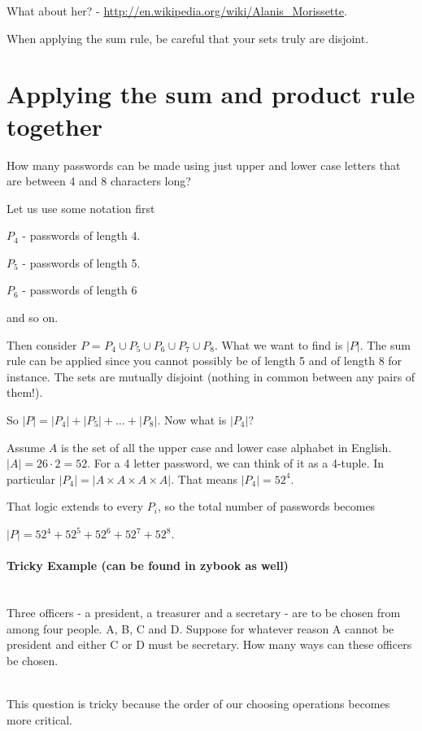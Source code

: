 \documentclass[12pt]{article}
\begin{document}
What about her? - \href{http://en.wikipedia.org/wiki/Alanis\_Morissette}{http://en.wikipedia.org/wiki/Alanis\_Morissette}.

When applying the sum rule, be careful that your sets truly are disjoint.

\section*{Applying the sum and product rule together}

How many passwords can be made using just upper and lower case letters that are between 4 and 8 characters long?

Let us use some notation first

$P_4$ - passwords of length 4.

$P_5$ - passwords of length 5.

$P_6$ - passwords of length 6

and so on.

Then consider $P$ = $P_4 \cup P_5 \cup P_6 \cup P_7 \cup P_8$. What we want to find is $|P|$. The sum rule can be applied since you cannot possibly be of length 5 and of length 8 for instance. The sets are mutually disjoint (nothing in common between any pairs of them!).

So $|P| = |P_4| + |P_5| + \ldots + |P_8|$. Now what is $|P_4|$?

Assume $A$ is the set of all the upper case and lower case alphabet in English. $|A| = 26 \cdot 2=52$. For a 4 letter password, we can think of it as a 4-tuple. In particular $|P_4| = |A \times A \times A \times A|$.
That means $|P_4| = 52^4$.

That logic extends to every $P_i$, so the total number of passwords becomes

$|P| = 52^4 + 52^5 + 52^6 + 52^7 + 52^8$.

\paragraph{Tricky Example (can be found in zybook as well)}~\\

Three officers - a president, a treasurer and a secretary - are to be chosen from among four people. A, B, C and D. Suppose for whatever reason A cannot be president and either C or D must be secretary. How many ways can these officers be chosen.

~\\
This question is tricky because the order of our choosing operations becomes more critical. 
\end{document}
